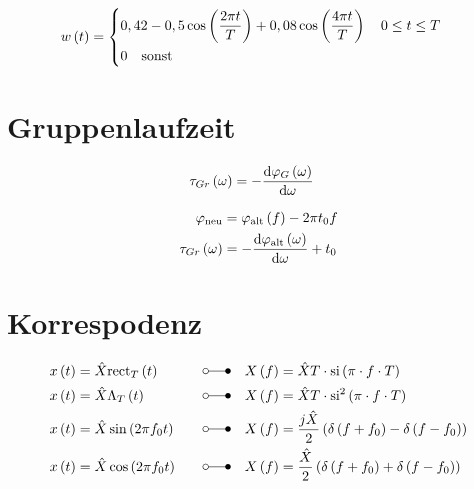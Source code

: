 \begin{boxleft}
\end{boxleft}\begin{boxrightshaded}
\begin{align*}
w\left(t\right)&=
\begin{dcases*}
  0,42-0,5\cos\left(\frac{2\pi t}{T}\right)+0,08\cos\left(\frac{4\pi t}{T}\right)\quad 0\leq t\leq T\\
  0\quad\text{sonst} 
\end{dcases*}
\end{align*}
\end{boxrightshaded}

\section{Gruppenlaufzeit}

\begin{boxleft}
\end{boxleft}\begin{boxrightshaded}
\begin{align*}
\tau_{Gr}\left(\omega\right)&=-\frac{\mathop{}\!\mathrm{d}\varphi_G\left(\omega\right)}{\mathop{}\!\mathrm{d} \omega}
\end{align*}
\end{boxrightshaded}

\begin{boxleft}
\end{boxleft}\begin{boxrightshaded}
\begin{align*}
\varphi_{\text{neu}}&=\varphi_{\text{alt}}\left(f\right)-2\pi t_0 f\\
\tau_{Gr}\left(\omega\right)&=-\frac{\mathop{}\!\mathrm{d}\varphi_{\text{alt}}\left(\omega\right)}{\mathop{}\!\mathrm{d} \omega}+t_0
\end{align*}
\end{boxrightshaded}

\section{Korrespodenz}

\begin{boxleft}
\end{boxleft}\begin{boxrightshaded}
\begin{align*}
x\left(t\right)&=\hat{X}\mathrm{rect}_{T}\left(t\right)\quad&\laplace\quad X\left(f\right)&=\hat{X}T\cdot\mathrm{si}\left(\pi\cdot f\cdot T\right)\\
x\left(t\right)&=\hat{X}\Lambda_{T}\left(t\right)\quad&\laplace\quad X\left(f\right)&=\hat{X}T\cdot\mathrm{si}^2\left(\pi\cdot f\cdot T\right)\\
x\left(t\right)&=\hat{X}\sin\left(2\pi f_0 t\right)\quad&\laplace\quad X\left(f\right)&=\frac{j\hat{X}}{2}\left(\delta\left(f+f_0\right)-\delta\left(f-f_0\right)\right)\\
x\left(t\right)&=\hat{X}\cos\left(2\pi f_0 t\right)\quad&\laplace\quad X\left(f\right)&=\frac{\hat{X}}{2}\left(\delta\left(f+f_0\right)+\delta\left(f-f_0\right)\right)
\end{align*}
\end{boxrightshaded}
